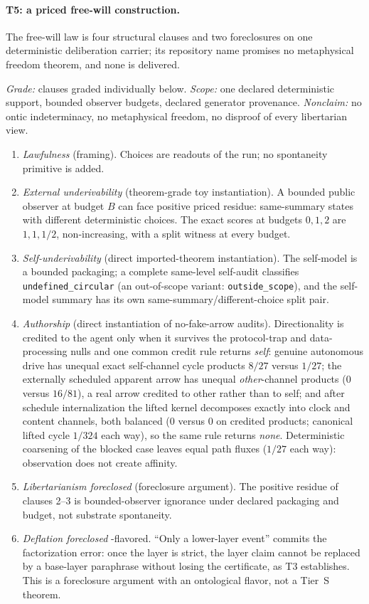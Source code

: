 \paragraph{T5: a priced free-will construction.}
The free-will law is four structural clauses and two foreclosures on one
deterministic deliberation carrier; its repository name promises no
metaphysical freedom theorem, and none is delivered.

\begin{theorem}
\label{thm:t5}
\gradeS{} \emph{Grade:} clauses graded individually below. \emph{Scope:} one
declared deterministic support, bounded observer budgets, declared generator
provenance. \emph{Nonclaim:} no ontic indeterminacy, no metaphysical
freedom, no disproof of every libertarian view.
\begin{enumerate}
\item \emph{Lawfulness} (framing). Choices are readouts of the run; no
spontaneity primitive is added.
\item \emph{External underivability} (theorem-grade toy instantiation). A
bounded public observer at budget $B$ can face positive priced residue:
same-summary states with different deterministic choices. The exact scores at
budgets $0,1,2$ are $1, 1, 1/2$, non-increasing, with a split witness at every
budget.
\item \emph{Self-underivability} (direct imported-theorem instantiation). The
self-model is a bounded packaging; a complete same-level self-audit
classifies \texttt{undefined\_circular} (an out-of-scope variant:
\texttt{outside\_scope}), and the self-model summary has its own
same-summary/different-choice split pair.
\item \emph{Authorship} (direct instantiation of no-fake-arrow audits).
Directionality is credited to the agent only when it survives the
protocol-trap and data-processing nulls and one common credit rule returns
\emph{self}: genuine autonomous drive has unequal exact self-channel cycle
products $8/27$ versus $1/27$; the externally scheduled apparent arrow has
unequal \emph{other}-channel products ($0$ versus $16/81$), a real arrow
credited to other rather than to self; and after schedule internalization the lifted kernel decomposes
exactly into clock and content channels, both balanced ($0$ versus $0$ on
credited products; canonical lifted cycle $1/324$ each way), so the same rule
returns \emph{none}. Deterministic coarsening of the blocked case leaves
equal path fluxes ($1/27$ each way): observation does not create affinity.
\item \emph{Libertarianism foreclosed} (foreclosure argument). The positive
residue of clauses 2--3 is bounded-observer ignorance under declared
packaging and budget, not substrate spontaneity.
\item \emph{Deflation foreclosed} \gradeO-flavored. ``Only a lower-layer
event'' commits the factorization error: once the layer is strict, the layer
claim cannot be replaced by a base-layer paraphrase without losing the
certificate, as T3 establishes. This is a foreclosure argument with an
ontological flavor, not a Tier~S theorem.
\end{enumerate}
\end{theorem}

